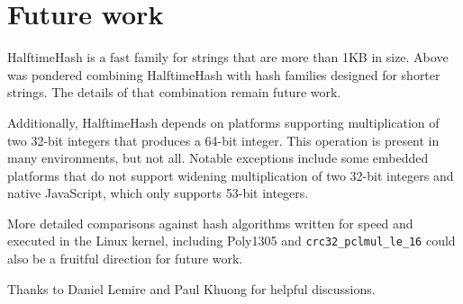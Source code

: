\documentclass[sigconf, nonacm]{acmart}
\begin{document}




\section{Future work}

HalftimeHash is a fast family for strings that are more than 1KB in size.
Above was pondered combining HalftimeHash with hash families designed for shorter strings.
The details of that combination remain future work.

Additionally, HalftimeHash depends on platforms supporting multiplication of two 32-bit integers that produces a 64-bit integer.
This operation is present in many environments, but not all.
Notable exceptions include some embedded platforms that do not support widening multiplication of two 32-bit integers and native JavaScript, which only supports 53-bit integers.

More detailed comparisons against hash algorithms written for speed and executed in the Linux kernel, including Poly1305 and \texttt{crc32\_pclmul\_le\_16} could also be a fruitful direction for future work.



%

\begin{acks}
Thanks to Daniel Lemire and Paul Khuong for helpful discussions.
\end{acks}









\end{document}
